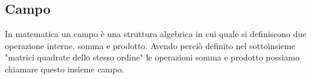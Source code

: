 \documentclass[a4paper]{article}
\begin{document}
\begin{itemize}
$
\\
\\
$\left[\begin{matrix}1/a & 0 & \\ 0& 1/d\end{matrix}\right]
* \left[\begin{matrix}a & b & \\ c & d\end{matrix}\right]
=\left[\begin{matrix}1&0 \\ 0&1 \end{matrix}\right]
$
\end{itemize}

\subsection{Campo}
In matematica un campo è una struttura algebrica in cui quale si definiscono due operazione interne, somma e prodotto. Avendo perciò definito nel sottoinsieme "matrici quadrate dello stesso ordine" le operazioni somma e prodotto possiamo chiamare questo insieme campo.
\end{document}
